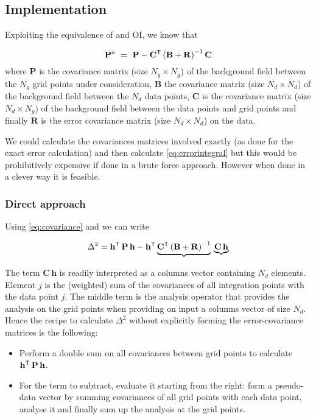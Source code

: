 \subsection{Implementation}
Exploiting the equivalence of \diva and OI, we know that

\begin{equation}
\mathbf{P}^a ~=~ \mathbf{P} -  {\mathbf{C}}^\mathsf{T} \left( \mathbf{B}+\mathbf{R} \right)^{-1} \mathbf{C}
\label{eq:covariance}
\end{equation}
where $\mathbf{P}$ is the covariance matrix (size $N_g\times N_g$) of the background field between the $N_g$ grid points under consideration, $\mathbf{B}$ 
the covariance matrix (size $N_d \times N_d$) of the background field between the $N_d$ data points, $\mathbf{C}$  is the
 covariance matrix (size $N_d \times N_g$) of the background field between the  data points and grid points and finally $\mathbf{R}$ is the error covariance matrix (size $N_d \times N_d$) on the data.
 
We could calculate the covariances matrices involved exactly (as done for the exact error calculation) and then calculate \eqref{eq:errorintegral} but this would be prohibitively expensive if done in a brute force approach. However when done in a clever way it is feasible.

\subsubsection{Direct approach}

Using \eqref{eq:covariance} and \label{eq:errorintegral} we can write

 \begin{equation}
 \Delta^2 = {\mathbf{h}}^\mathsf{T}\, \mathbf{P} \, \mathbf{h} - {\mathbf{h}}^\mathsf{T} \underbrace{{\mathbf{C}}^\mathsf{T} \left( \mathbf{B}+\mathbf{R} \right)^{-1}} \, \underbrace{\mathbf{C}  \, \mathbf{h}}
 \label{eq:totalerror}
 \end{equation}
 
The term $\mathbf{C}  \, \mathbf{h}$ is readily interpreted as a columns vector containing $N_d$ elements. Element $j$ is the (weighted) sum of the covariances of all integration points with the data point $j$. The middle term is the analysis operator that provides the analysis on the grid points when providing on input a columns vector of size $N_d$. Hence the recipe to calculate $\Delta^2$ without explicitly forming the error-covariance matrices is the following:
\begin{itemize}
\item Perform a double sum on all covariances between grid points to calculate ${\mathbf{h}}^\mathsf{T} \, \mathbf{P} \, \mathbf{h}$.
\item For the term to subtract, evaluate it starting from the right: form a pseudo-data vector by summing covariances of all grid points with each data point, analyse it and finally sum up the analysis at the grid points.
\end{itemize}

